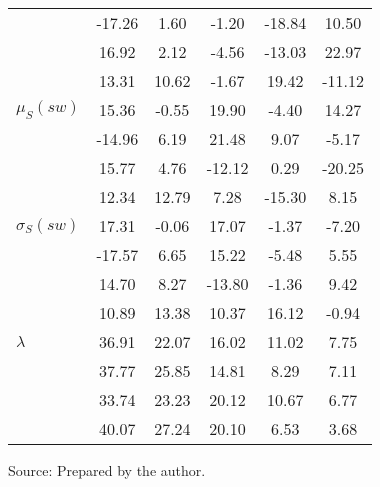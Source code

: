 \begin{table}[h!]
\begin{center}
\begin{tabular}{| l || c | c | c | c | c |}
 & -17.26  & 1.60  & -1.20  & -18.84  & 10.50 \\
 & 16.92  & 2.12  & -4.56  & -13.03  & 22.97 \\
 & 13.31  & 10.62  & -1.67  & 19.42  & -11.12 \\\hline
$\mu_S(sw)$ & 15.36  & -0.55  & 19.90  & -4.40  & 14.27 \\
 & -14.96  & 6.19  & 21.48  & 9.07  & -5.17 \\
 & 15.77  & 4.76  & -12.12  & 0.29  & -20.25 \\
 & 12.34  & 12.79  & 7.28  & -15.30  & 8.15 \\\hline
$\sigma_S(sw)$ & 17.31  & -0.06  & 17.07  & -1.37  & -7.20 \\
 & -17.57  & 6.65  & 15.22  & -5.48  & 5.55 \\
 & 14.70  & 8.27  & -13.80  & -1.36  & 9.42 \\
 & 10.89  & 13.38  & 10.37  & 16.12  & -0.94 \\\hline\hline
$\lambda$ & 36.91  & 22.07  & 16.02  & 11.02  & 7.75 \\
 & 37.77  & 25.85  & 14.81  & 8.29  & 7.11 \\
 & 33.74  & 23.23  & 20.12  & 10.67  & 6.77 \\
 & 40.07  & 27.24  & 20.10  & 6.53  & 3.68 \\\hline
\end{tabular}
\begin{flushleft}
		Source: Prepared by the author.\
\end{flushleft}
\end{center}
\end{table}
